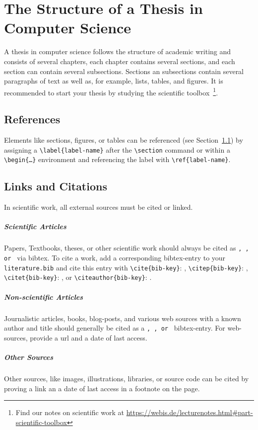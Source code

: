\chapter{The Structure of a Thesis in Computer Science}\label{structure}

A thesis in computer science follows the structure of academic writing and consists of several chapters, each chapter contains several sections, and each section can contain several subsections. Sections an subsections contain several paragraphs of text as well as, for example, lists, tables, and figures. It is recommended to start your thesis by studying the scientific toolbox~\footnote{Find our notes on scientific work at \url{https://webis.de/lecturenotes.html\#part-scientific-toolbox}}.

\enlargethispage{\baselineskip}

\section{References}\label{references}

Elements like sections, figures, or tables can be referenced (see Section~\ref{references}) by assigning a \texttt{\textbackslash label\{label-name\}} after the  \texttt{\textbackslash section} command or within a \texttt{\textbackslash begin\{\dots\}} environment and referencing the label with \texttt{\textbackslash ref\{label-name\}}. 

\section{Links and Citations}

In scientific work, all external sources must be cited or linked. 

\paragraph{Scientific Articles} Papers, Textbooks, theses, or other scientific work should always be cited as \texttt{\@Article, \@InProceedings, or \@Book} via bibtex. To cite a work, add a corresponding bibtex-entry to your \texttt{literature.bib} and cite this entry with \texttt{\textbackslash cite\{bib-key\}}: \cite{manning:2001}, \texttt{\textbackslash citep\{bib-key\}}: \cite{manning:2001}, \texttt{\textbackslash citet\{bib-key\}}: \citet{manning:2001}, or \texttt{\textbackslash citeauthor\{bib-key\}}: \citeauthor{manning:2001}. 

\paragraph{Non-scientific Articles} Journalistic articles, books, blog-posts, and various web sources with a known author and title should generally be cited as a \texttt{\@Article, \@Book, or \@Misc} bibtex-entry. For web-sources, provide a url and a date of last access.

\paragraph{Other Sources} Other sources, like images, illustrations, libraries, or source code can be cited by proving a link an a date of last access in a footnote on the page.  